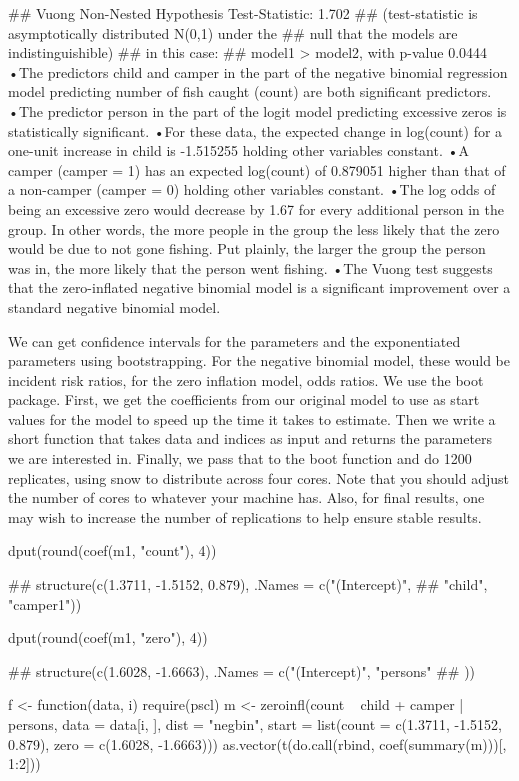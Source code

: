## Vuong Non-Nested Hypothesis Test-Statistic: 1.702 
## (test-statistic is asymptotically distributed N(0,1) under the
##  null that the models are indistinguishible)
## in this case:
## model1 > model2, with p-value 0.0444
 •The predictors child and camper in the part of the negative binomial regression model predicting number of fish caught (count) are both significant predictors.
•The predictor person in the part of the logit model predicting excessive zeros is statistically significant.
•For these data, the expected change in log(count) for a one-unit increase in child is -1.515255 holding other variables constant. 
•A camper (camper = 1) has an expected log(count) of 0.879051 higher than that of a non-camper (camper = 0) holding other variables constant.
•The log odds of being an excessive zero would decrease by 1.67 for every additional person in the group. In other words, the more people in the group the less likely that the zero would be due to not gone fishing. Put plainly, the larger the group the person was in, the more likely that the person went fishing.
•The Vuong test suggests that the zero-inflated negative binomial model is a significant improvement over a standard negative binomial model. 

We can get confidence intervals for the parameters and the exponentiated parameters using bootstrapping. For the negative binomial model, these would be incident risk ratios, for the zero inflation model, odds ratios. We use the boot package. First, we get the coefficients from our original model to use as start values for the model to speed up the time it takes to estimate. Then we write a short function that takes data and indices as input and returns the parameters we are interested in. Finally, we pass that to the boot function and do 1200 replicates, using snow to distribute across four cores. Note that you should adjust the number of cores to whatever your machine has. Also, for final results, one may wish to increase the number of replications to help ensure stable results.



dput(round(coef(m1, "count"), 4))
 
## structure(c(1.3711, -1.5152, 0.879), .Names = c("(Intercept)", 
## "child", "camper1"))
 
dput(round(coef(m1, "zero"), 4))
 
## structure(c(1.6028, -1.6663), .Names = c("(Intercept)", "persons"
## ))
 
f <- function(data, i) {
  require(pscl)
  m <- zeroinfl(count ~ child + camper | persons,
    data = data[i, ], dist = "negbin",
    start = list(count = c(1.3711, -1.5152, 0.879), zero = c(1.6028, -1.6663)))
  as.vector(t(do.call(rbind, coef(summary(m)))[, 1:2]))
}


